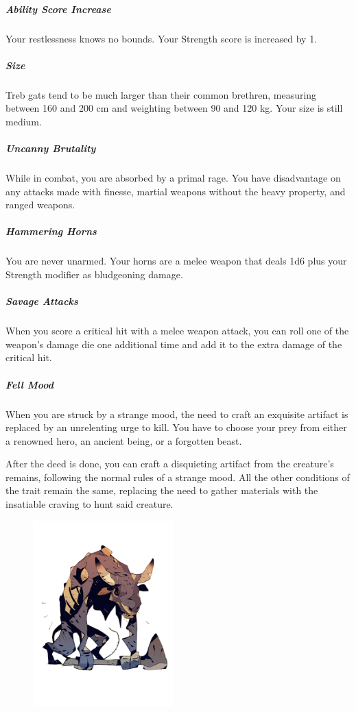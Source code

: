    \subparagraph{Ability Score Increase} Your restlessness knows no bounds.
    Your Strength score is increased by 1.

    \subparagraph{Size} Treb gats tend to be much larger than their common brethren, measuring between 160 and 200 cm and weighting between 90 and 120 kg.
    Your size is still medium.

    \subparagraph{Uncanny Brutality} While in combat, you are absorbed by a primal rage.
    You have disadvantage on any attacks made with finesse, martial weapons without the heavy property, and ranged weapons.

    \subparagraph{Hammering Horns} You are never unarmed.
    Your horns are a melee weapon that deals 1d6 plus your Strength modifier as bludgeoning damage.

    \subparagraph{Savage Attacks} When you score a critical hit with a melee weapon attack, you can roll one of the weapon's damage die one additional time and add it to the extra damage of the critical hit.

    \subparagraph{Fell Mood} When you are struck by a strange mood, the need to craft an exquisite artifact is replaced by an unrelenting urge to kill.
    You have to choose your prey from either a renowned hero, an ancient being, or a forgotten beast.

    After the deed is done, you can craft a disquieting artifact from the creature's remains, following the normal rules of a strange mood.
    All the other conditions of the trait remain the same, replacing the need to gather materials with the insatiable craving to hunt said creature.

\begin{figure}[!b]
    \centering
    \includegraphics[width=0.48\textwidth]{04kins/img/11gat_treb.png}
\end{figure}

\newpage
